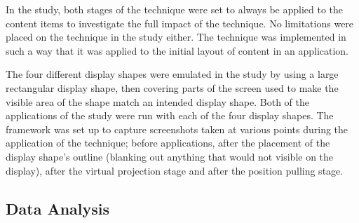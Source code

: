 \documentclass[twocolumn,compsoc]{cvm}
\begin{document}
{In the study, both stages of the technique were set to always be applied to the content items to investigate the full impact of the technique.
No limitations were placed on the technique in the study either.
The technique was implemented in such a way that it was applied to the initial layout of content in an application.

The four different display shapes were emulated in the study by using a large rectangular display shape, then covering parts of the screen used to make the visible area of the shape match an intended display shape.
Both of the applications of the study were run with each of the four display shapes.
The framework was set up to capture screenshots taken at various points during the application of the technique; before applications, after the placement of the display shape's outline (blanking out anything that would not visible on the display),  after the virtual projection stage and after the position pulling stage.


\subsection{Data Analysis}
\label{subsec:dataanalysis} 

}
\end{document}
